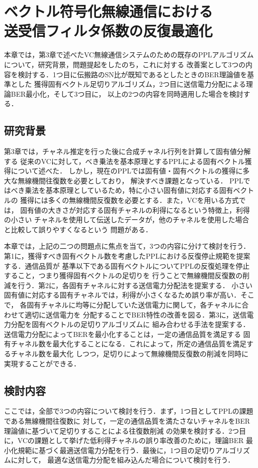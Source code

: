 \chapter{ベクトル符号化無線通信における\\送受信フィルタ係数の反復最適化
}
本章では，第3章で述べたVC無線通信システムのための既存のPPLアルゴリズムについて，研究背景，問題提起をしたのち，これに対する
改善案として3つの内容を検討する．1つ目に伝搬路のSN比が既知であるとしたときのBER理論値を基準とした
獲得固有ベクトル足切りアルゴリズム，2つ目に送信電力分配による理論BER最小化，そして3つ目に，
以上の2つの内容を同時適用した場合を検討する．

\section{研究背景}
第3章では，チャネル推定を行った後に合成チャネル行列を計算して固有値分解する
従来のVCに対して，べき乗法を基本原理とするPPLによる固有ベクトル獲得について述べた．
しかし，現在のPPLでは固有値・固有ベクトルの獲得に多大な無線機間往復数を必要としており，
解決すべき課題となっている．
PPLではべき乗法を基本原理としているため，特に小さい固有値に対応する固有ベクトルの
獲得には多くの無線機間反復数を必要とする．また，VCを用いる方式では，
固有値の大きさが対応する固有チャネルの利得になるという特徴上，利得の小さい
チャネルを使用して伝送したデータが，他のチャネルを使用した場合と比較して誤りやすくなるという
問題がある．

本章では，上記の二つの問題点に焦点を当て，3つの内容に分けて検討を行う．
第1に，獲得すべき固有ベクトル数を考慮したPPLにおける反復停止規範を提案する．通信品質が
基準以下である固有ベクトルについてPPLの反復処理を停止すること，つまり獲得固有ベクトルの足切りを
行うことで無線機間反復数の削減を行う．第2に，各固有チャネルに対する送信電力分配法を提案する．
小さい固有値に対応する固有チャネルでは，利得が小さくなるため誤り率が高い．そこで，
各固有チャネルに均等に分配していた送信電力に関して，各チャネルに合わせて適切に送信電力を
分配することでBER特性の改善を図る．第3に，送信電力分配を固有ベクトルの足切りアルゴリズムに
組み合わせる手法を提案する．送信電力分配によってBERを最小化することは，一定の通信品質を満足する
固有チャネル数を最大化することになる．これによって，所定の通信品質を満足するチャネル数を最大化
しつつ，足切りによって無線機間反復数の削減を同時に実現することができる．

\section{検討内容}
ここでは，全部で3つの内容について検討を行う．まず，1つ目としてPPLの課題である無線機間往復数に
対して，一定の通信品質を満たさないチャネルをBER理論値に基づいて足切りすることによる往復数削減
の効果を検討する．2つ目に，VCの課題として挙げた低利得チャネルの誤り率改善のために，理論BER
最小化規範に基づく最適送信電力分配を行う．最後に，1つ目の足切りアルゴリズムに対して，
最適な送信電力分配を組み込んだ場合について検討を行う．

